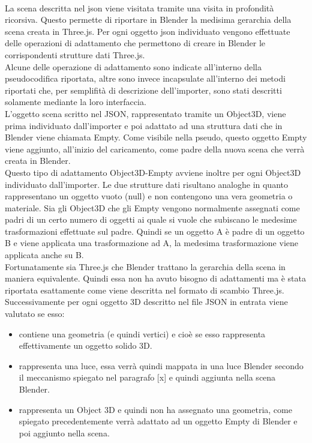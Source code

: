 \\
La scena descritta nel json viene visitata tramite una visita in profondità ricorsiva. 
Questo permette di riportare in Blender la medisima gerarchia della scena creata in Three.js.
Per ogni oggetto json individuato vengono effettuate delle operazioni di adattamento che permettono di creare in Blender le corrispondenti strutture dati Three.js.
\\
Alcune delle operazione di adattamento sono indicate all’interno della pseudocodifica riportata, altre sono invece incapsulate all’interno dei metodi riportati che, per semplifità di descrizione dell’importer, sono stati descritti solamente mediante la loro interfaccia.
\\
L’oggetto scena scritto nel JSON, rappresentato  tramite un Object3D, viene prima individuato dall’importer e poi  adattato ad una struttura dati che in Blender viene chiamata Empty. 
Come visibile nella pseudo, questo oggetto Empty viene aggiunto, all’inizio del caricamento, come padre della nuova scena che verrà creata in Blender.
\\
Questo tipo di adattamento Object3D-Empty avviene inoltre per ogni Object3D individuato dall’importer.
Le due strutture dati risultano analoghe in quanto rappresentano un oggetto vuoto (null) e non contengono una vera geometria o materiale. Sia gli Object3D che gli Empty vengono normalmente assegnati come padri di un certo numero di oggetti ai quale si vuole che subiscano le medesime trasformazioni effettuate sul padre. Quindi se un oggetto A è padre di un oggetto B e viene applicata una trasformazione ad A, la medesima trasformazione viene applicata anche su B.
\\
Fortunatamente sia Three.js che Blender trattano la gerarchia della scena in maniera equivalente. Quindi essa non ha avuto bisogno di adattamenti ma è stata riportata esattamente come viene descritta nel formato di scambio Three.js.
\\
Successivamente per ogni oggetto 3D descritto nel file JSON in entrata viene valutato se esso:
\begin{itemize}
\item contiene una geometria (e quindi vertici) e cioè se esso rappresenta effettivamente un oggetto solido 3D.
\item rappresenta una luce, essa verrà quindi mappata in una luce Blender secondo il meccanismo spiegato nel paragrafo [x] e quindi aggiunta nella scena Blender.
\item rappresenta un Object 3D e quindi non ha assegnato una geometria, come spiegato precedentemente verrà adattato ad un oggetto Empty di Blender e poi aggiunto nella scena.
\end{itemize}
